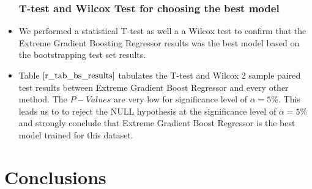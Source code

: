 \documentclass[twoside,12pt]{article}
\begin{document}
\begin{itemize}
\FloatBarrier
\subsubsection{T-test and Wilcox Test for choosing the best model}
	\item
	We performed a statistical T-test as well a a Wilcox test to confirm that the Extreme Gradient Boosting Regressor results was the best model based on the bootstrapping test set results.
		\item
		Table $\eqref{r_tab_bs_results}$ tabulates the T-test and Wilcox 2 sample paired test results between Extreme Gradient Boost Regressor and every other method. The $P-Values$ are very low for significance level of $\alpha = 5\%$. This leads us to to reject the NULL hypothesis at the significance level of $\alpha = 5\%$ and strongly conclude that Extreme Gradient Boost Regressor is the best model trained for this dataset.
		\FloatBarrier
		\begin{table}[h]
			\centering
			\caption[]{T-test and Wilcox Test comparing Error rate of Extreme Gradient Boost Regressor with other Regression models used }
			\label{r_tab_bs_results}
		\end{table}
\end{itemize}



\FloatBarrier
\section{Conclusions}
\label{Conclusions}
\end{document}
